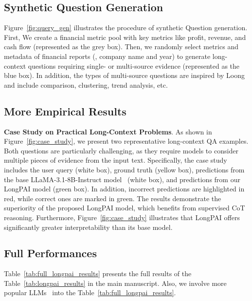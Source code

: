 

\subsection{Synthetic Question Generation}
Figure~\ref{fig:query_gen} illustrates the procedure of synthetic Question generation. First, We create a financial metric pool with key metrics like profit, revenue, and cash flow (represented as the grey box). Then, we randomly select metrics and metadata of financial reports (\eg, company name and year) to generate long-context questions requiring single- or multi-source evidence (represented as the blue box). In addition, the types of multi-source questions are inspired by Loong~\cite{wang2024leave} and include comparison, clustering, trend analysis, etc.

\subsection{More Empirical Results}


\noindent \textbf{Case Study on Practical Long-Context Problems}.
As shown in Figure~\ref{fig:case_study}, we present two representative long-context QA examples. Both questions are particularly challenging, as they require models to consider multiple pieces of evidence from the input text. Specifically, the case study includes the user query (white box), ground truth (yellow box), predictions from the base LLaMA-3.1-8B-Instruct model~\cite{dubey2024llama} (white box), and predictions from our LongPAI model (green box). In addition, incorrect predictions are highlighted in red, while correct ones are marked in green. The results demonstrate the superiority of the proposed LongPAI model, which benefits from supervised CoT reasoning. Furthermore, Figure~\ref{fig:case_study} illustrates that LongPAI offers significantly greater interpretability than its base model.



% 




\subsection{Full Performances}
Table~\ref{tab:full_longpai_results} presents the full results of the Table~\ref{tab:longpai_results} in the main manuscript. Also, we involve more popular LLMs~\cite{yang2024qwen2-5,guo2025deepseek} into the Table~\ref{tab:full_longpai_results}.

